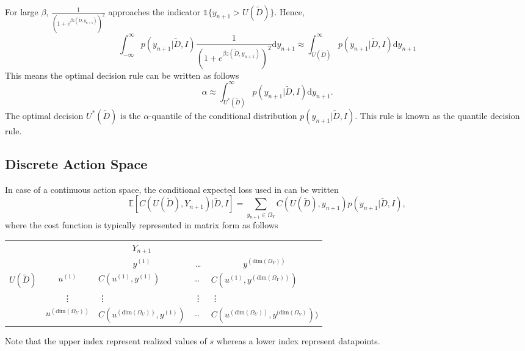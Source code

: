 \begin{example}
\begin{equation}
\begin{split}
		\end{split}
	\end{equation}
	For large $\beta$, $\frac{1}{(1+e^{\beta z(\tilde{D},y_{n+1})})^2}$ approaches the indicator $\mathbb{1}\{y_{n+1}>U(\tilde{D})\}$. Hence,
	\begin{equation}
		\int_{-\infty}^{\infty} p(y_{n+1}|\tilde{D},I)\frac{1}{(1+e^{\beta z(\tilde{D},y_{n+1})})^2} \mathrm{d}y_{n+1} \approx \int_{U(\tilde{D})}^{\infty} p(y_{n+1}|\tilde{D},I) \mathrm{d}y_{n+1}
	\end{equation}
	This means the optimal decision rule can be written as follows
	\begin{equation}
		\alpha \approx \int_{U^*(\tilde{D})}^{\infty} p(y_{n+1}|\tilde{D},I) \mathrm{d}y_{n+1}.
		\label{eq:quantile_decision_rule}
	\end{equation}
	The optimal decision $U^*(\tilde{D})$ is the $\alpha$-quantile of the conditional distribution $p(y_{n+1}|\tilde{D},I)$. This rule is known as the quantile decision rule.
\end{example}

\subsection{Discrete Action Space}
In case of a continuous action space, the conditional expected loss used in  can be written
\begin{equation}
	\mathbb{E}[C(U(\tilde{D}), Y_{n+1})|\tilde{D},I] = \sum_{y_{n+1}\in \Omega_Y}C(U(\tilde{D}),y_{n+1})p(y_{n+1}|\tilde{D},I),
	\label{eq:conditional_cost_discrete}
\end{equation}
where the cost function is typically represented in matrix form as follows
\begin{center}
	\begin{tabular}{ c  c  c  c  c  }
		&& $Y_{n+1}$& & \\
		&& $y^{(1)}$ & \dots & $y^{(\text{dim}(\Omega_Y))}$ \\
		\cline{3-5}
		$U(\tilde{D})$ & $u^{(1)}$& \multicolumn{1}{|l}{$C(u^{(1)}, y^{(1)})$} &\multicolumn{1}{l}{\dots}&\multicolumn{1}{l|}{$C(u^{(1)}, y^{(\text{dim}(\Omega_Y))})$} \\
		& \vdots & \multicolumn{1}{|l}{\vdots} &\multicolumn{1}{l}{\vdots}&\multicolumn{1}{l|}{\vdots} \\
		& $u^{(\text{dim}(\Omega_U))}$ & \multicolumn{1}{|l}{$C(u^{(\text{dim}(\Omega_U))}, y^{(1)})$} &\multicolumn{1}{l}{\dots}&\multicolumn{1}{l|}{$C(u^{(\text{dim}(\Omega_U))}, y^{(\text{dim}(\Omega_Y)}))$} \\
		\cline{3-5}
	\end{tabular}
\end{center}
Note that the upper index represent realized values of $s$ whereas a lower index represent datapoints.

